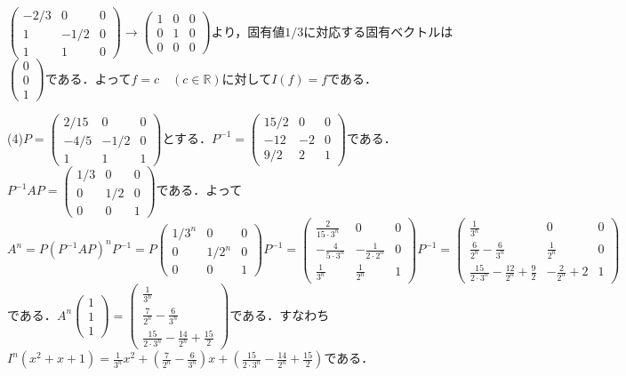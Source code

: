 \documentclass[
		book,
		head_space=20mm,
		foot_space=20mm,
		gutter=10mm,
		line_length=190mm
]{jlreq}
\begin{document}
$\begin{pmatrix}
	-2/3 & 0 & 0\\
	1 & -1/2 & 0\\
	1 & 1 & 0
	\end{pmatrix}\rightarrow \begin{pmatrix}
	1 & 0 & 0\\
	0 & 1 & 0\\
	0 & 0 & 0
	\end{pmatrix}$より，固有値$1/3$に対応する固有ベクトルは$\begin{pmatrix}
	0\\
	0\\
	1
\end{pmatrix}$である．よって$f=c \quad(c\in \mathbb{R})$に対して$I(f)=f$である．

(4)$P=\begin{pmatrix}
	2/15 & 0 & 0\\
	-4/5 & -1/2 & 0\\
	1 & 1 & 1
\end{pmatrix}$とする．$P^{-1}=\begin{pmatrix}
	15/2 & 0 & 0\\
	-12 & -2 & 0\\
	9/2 & 2 & 1
\end{pmatrix}$である．
$P^{-1}AP=\begin{pmatrix}
	1/3 & 0 & 0\\
	0 & 1/2 & 0\\
	0 & 0 & 1
\end{pmatrix}$である．よって$A^n=P(P^{-1}AP)^nP^{-1}=P\begin{pmatrix}
	1/3^n & 0 & 0\\
	0 & 1/2^n & 0\\
	0 & 0 & 1
\end{pmatrix}P^{-1}=\begin{pmatrix}
	\frac{2}{15 \cdot 3^n} & 0 & 0\\
	-\frac{4}{5 \cdot 3^n} & -\frac{1}{2 \cdot 2^n} & 0\\
	\frac{1}{3^n} & \frac{1}{2^n} & 1
	\end{pmatrix}P^{-1}=\begin{pmatrix}
		\frac{1}{3^n} & 0 & 0\\
		\frac{6}{2^n}-\frac{6}{3^n} & \frac{1}{2^n} & 0\\
		\frac{15}{2\cdot 3^n}-\frac{12}{2^n}+\frac{9}{2} & -\frac{2}{2^n}+2 & 1
	\end{pmatrix}$である．$A^n\begin{pmatrix}
		1\\
		1\\
		1
	\end{pmatrix}=\begin{pmatrix}
		\frac{1}{3^n}\\
		\frac{7}{2^n}-\frac{6}{3^n}\\
		\frac{15}{2\cdot 3^n}-\frac{14}{2^n}+\frac{15}{2}
	\end{pmatrix}$である．すなわち$I^n(x^2+x+1)=\frac{1}{3^n}x^2+(\frac{7}{2^n}-\frac{6}{3^n})x+(\frac{15}{2\cdot 3^n}-\frac{14}{2^n}+\frac{15}{2})$である．
\end{document}
